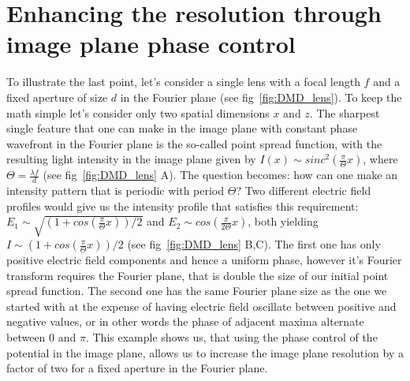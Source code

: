\section{Enhancing the resolution through image plane phase control}
To illustrate the last point, let's consider a single lens with a focal length $f$ and a fixed aperture of size $d$ in the Fourier plane (see fig~\ref{fig:DMD_lens}). To keep the math simple let's consider only two spatial dimensions $x$ and $z$. The sharpest single feature that one can make in the image plane with constant phase wavefront in the Fourier plane is the so-called point spread function, with the resulting light intensity in the image plane given by $I(x) \sim sinc^2(\frac{\pi}{\Theta} x)$, where $\Theta = \frac{\lambda f}{d}$ (see fig~\ref{fig:DMD_lens} A). The question becomes: how can one make an intensity pattern that is periodic with period $\Theta$? Two different electric field profiles would give us the intensity profile that satisfies this requirement: $E_1 \sim \sqrt{(1+cos(\frac{\pi}{\Theta}x))/2}$ and $E_2 \sim cos(\frac{\pi}{2\Theta} x)$, both yielding $I \sim (1+cos(\frac{\pi}{\Theta}x))/2$ (see fig~\ref{fig:DMD_lens} B,C). The first one has only positive electric field components and hence a uniform phase, however it's Fourier transform requires the Fourier plane, that is double the size of our initial point spread function. The second one has the same Fourier plane size as the one we started with at the expense of having electric field oscillate between positive and negative values, or in other words the phase of adjacent maxima alternate between $0$ and $\pi$. This example shows us, that using the phase control of the potential in the image plane, allows us to increase the image plane resolution by a factor of two for a fixed aperture in the Fourier plane.

